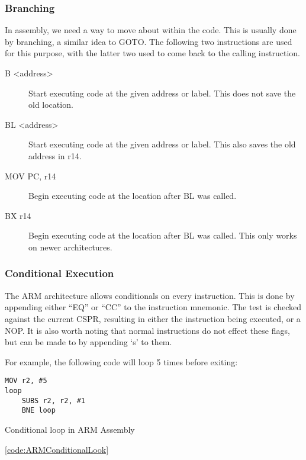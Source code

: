 			\subsubsection{Branching}
				In assembly, we need a way to move about within the code. 
				This is usually done by branching, a similar idea to GOTO. 
				The following two instructions are used for this purpose, with the latter two used to come back to the calling instruction. 
				\begin{description}
					\item[B <address>] Start executing code at the given address or label. 
						This does not save the old location. 
					\item[BL <address>] Start executing code at the given address or label. 
						This also saves the old address in r14. 
					\item[MOV PC, r14] Begin executing code at the location after BL was called. 
					\item[BX r14] Begin executing code at the location after BL was called. 
						This only works on newer architectures. 
				\end{description}

			\subsubsection{Conditional Execution}
				The ARM architecture allows conditionals on every instruction. 
				This is done by appending either ``EQ'' or ``CC'' to the instruction mnemonic. 
				The test is checked against the current CSPR, resulting in either the instruction being executed, or a NOP. 
				It is also worth noting that normal instructions do not effect these flags, but can be made to by appending `s' to them. 
				
				For example, the following code will loop 5 times before exiting:
				\begin{code}
					\begin{lstlisting}[language={[ARM]assembler}]
	MOV r2, #5
loop
	SUBS r2, r2, #1
	BNE loop
					\end{lstlisting}
					\caption{Conditional loop in ARM Assembly}
					\ref{code:ARMConditionalLook}
				\end{code}

